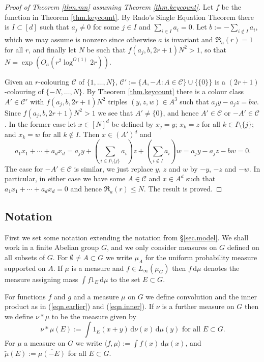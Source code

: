 \documentclass[12pt,reqno]{amsart}
\providecommand{\wt}{\widetilde}
\newcommand{\dd}{\,\mathrm{d}}
\numberwithin{equation}{section}
\begin{document}
\begin{proof}[Proof of Theorem \ref{thm.mn} assuming Theorem \ref{thm.keycount}]
Let $f$ be the function in Theorem \ref{thm.keycount}.  By Rado's Single Equation Theorem \cite[Theorem 9.5, p255]{lanrob::} there is $I \subset [d]$ such that $a_j \neq 0$ for some $j \in I$ and $\sum_{i\in I}{a_i}=0$. Let $b:=-\sum_{i \not \in I}{a_i}$, which we may assume is nonzero since otherwise $a$ is invariant and $\mathfrak{R}_a(r)=1$ for all $r$, and finally let $N$ be such that $f(a_j,b,2r+1)N^2>1$, so that $N=\exp(O_{a}(r^2\log^{O(1)}2r))$.

Given an $r$-colouring $\mathcal{C}$ of $\{1,\dots,N\}$, $\mathcal{C}':=\{A,-A : A \in \mathcal{C}\}\cup \{\{0\}\}$ is a $(2r+1)$-colouring of $\{-N,\dots,N\}$. By Theorem \ref{thm.keycount} there is a colour class $A' \in \mathcal{C}'$ with $f(a_j,b,2r+1)N^2$ triples $(y,z,w) \in A^3$ such that $a_jy-a_jz=bw$. Since $f(a_j,b,2r+1)N^2>1$ we see that $A' \neq \{0\}$, and hence $A' \in \mathcal{C}$ or $-A' \in \mathcal{C}$. In the former case let $x \in [N]^d$ be defined by $x_j= y$; $x_k= z$ for all $k \in I \setminus \{j\}$; and $x_k= w$ for all $k \not \in I$. Then $x \in (A')^d$ and
\begin{equation*}
a_1x_1+\cdots + a_dx_d = a_jy + \left(\sum_{i \in I\setminus \{j\}}{a_i}\right)z + \left(\sum_{i \not \in I}{a_i}\right)w = a_jy-a_jz-bw=0.
\end{equation*}
The case for $-A' \in \mathcal{C}$ is similar, we just replace $y$, $z$ and $w$ by $-y$, $-z$ and $-w$. In particular, in either case we have some $A \in \mathcal{C}$ and $x \in A^d$ such that $a_1x_1+\cdots + a_dx_d=0$ and hence $\mathfrak{R}_a(r) \leq N$. The result is proved.
\end{proof}

\subsection{Notation} First we set some notation extending the notation from \S\ref{sec.model}. We shall work in a finite Abelian group $G$, and we only consider measures on $G$ defined on all subsets of $G$. For $\emptyset \neq A\subset G$ we write $\mu_A$ for the uniform probability measure supported on $A$. If $\mu$ is a measure and $f \in L_\infty(\mu_G)$ then $f\dd \mu$ denotes the measure assigning mass $\int{f1_E\dd\mu}$ to the set $E \subset G$. 

For functions $f$ and $g$ and a measure $\mu$ on $G$ we define convolution and the inner product as in (\ref{eqn.earlier}) and (\ref{eqn.inner}). If $\nu$ is a further measure on $G$ then we define $\nu \ast \mu$ to be the measure given by
\begin{equation*}
\nu\ast \mu(E):=\int{1_E(x+y)\dd\nu(x)\dd\mu(y)} \text{ for all }E \subset G.
\end{equation*}
For $\mu$ a measure on $G$ we write $\langle f,\mu\rangle:=\int{f(x)\dd\mu(x)}$, and $\wt{\mu}(E):=\overline{\mu(-E)}$ for all $E \subset G$.
\end{document}
